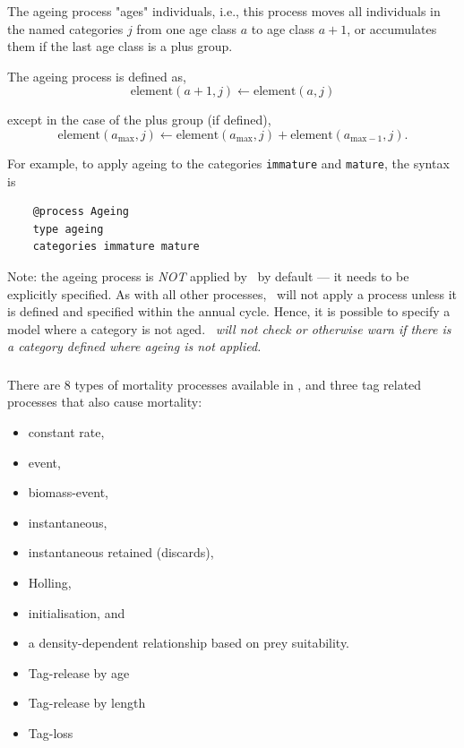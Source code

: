 The ageing process "ages" individuals, i.e., this process moves all individuals in the named categories $j$ from one age class $a$ to age class $a + 1$, or accumulates them if the last age class is a plus group.

The ageing process is defined as,
\begin{equation}
  \text{element}(a + 1,j) \leftarrow \text{element}(a,j)
\end{equation}

except in the case of the plus group (if defined),
\begin{equation}
  \text{element}(a_{\text{max}}, j) \leftarrow \text{element}(a_{\text{max}}, j) + \text{element}(a_{\text{max}-1}, j).
\end{equation}

For example, to apply ageing to the categories \texttt{immature} and \texttt{mature}, the syntax is

{\small{\begin{verbatim}
	@process Ageing
	type ageing
	categories immature mature
	\end{verbatim}}}

Note: the ageing process is \emph{NOT} applied by \CNAME\ by default --- it needs to be explicitly specified. As with all other processes, \CNAME\ will not apply a process unless it is defined and specified within the annual cycle. Hence, it is possible to specify a model where a category is not aged. \emph{\CNAME\ will not check or otherwise warn if there is a category defined where ageing is not applied.}

\subsubsection{\label{sec:Process-Mortality}}

There are 8 types of mortality processes available in \CNAME, and three tag related processes that also cause mortality:

\begin{itemize}
	\item constant rate,
	\item event,
	\item biomass-event,
	\item instantaneous,
	\item instantaneous retained (discards),
	\item Holling,
	\item initialisation, and
	\item a density-dependent relationship based on prey suitability.
	\item Tag-release by age
	\item Tag-release by length	
	\item Tag-loss
\end{itemize}

